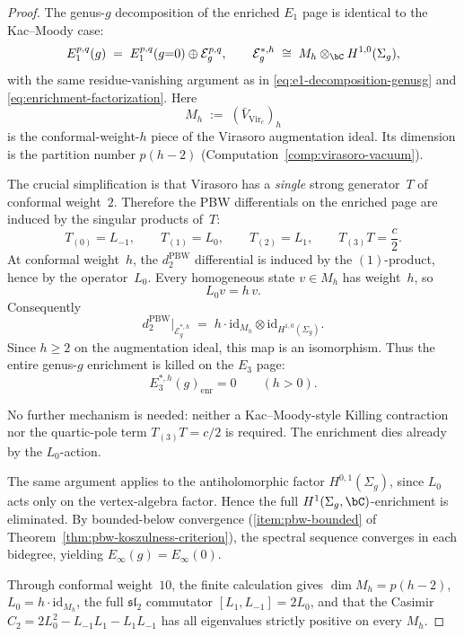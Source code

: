 \begin{proof}
The genus-$g$ decomposition of the enriched $E_1$ page is identical to
the Kac--Moody case:
\[
E_1^{p,q}(g) \;=\; E_1^{p,q}(g{=}0) \oplus \mathcal{E}^{p,q}_g,
\qquad
\mathcal{E}_g^{*,h} \;\cong\; M_h \otimes_{\bC} H^{1,0}(\Sigma_g),
\]
with the same residue-vanishing argument as in
\eqref{eq:e1-decomposition-genusg} and
\eqref{eq:enrichment-factorization}.  Here
\[
M_h \;:=\; (\bar{V}_{\mathrm{Vir}_c})_h
\]
is the conformal-weight-$h$ piece of the Virasoro augmentation ideal.
Its dimension is the partition number $p(h-2)$
\textup{(}Computation~\textup{\ref{comp:virasoro-vacuum}}\textup{)}.

The crucial simplification is that Virasoro has a \emph{single}
strong generator~$T$ of conformal weight~$2$.  Therefore the PBW
differentials on the enriched page are induced by the singular
products of~$T$:
\[
T_{(0)} = L_{-1}, \qquad
T_{(1)} = L_0, \qquad
T_{(2)} = L_1, \qquad
T_{(3)}T = \frac{c}{2}.
\]
At conformal weight~$h$, the $d_2^{\mathrm{PBW}}$ differential is
induced by the $(1)$-product, hence by the operator~$L_0$.
Every homogeneous state $v \in M_h$ has weight~$h$, so
\[
L_0 v = h\,v.
\]
Consequently
\[
d_2^{\mathrm{PBW}}\big|_{\mathcal{E}_g^{*,h}}
\;=\;
h \cdot \mathrm{id}_{M_h}
\otimes
\mathrm{id}_{H^{1,0}(\Sigma_g)}.
\]
Since $h \geq 2$ on the augmentation ideal, this map is an
isomorphism.  Thus the entire genus-$g$ enrichment is killed on the
$E_3$ page:
\[
E_3^{*,h}(g)_{\mathrm{enr}} = 0
\qquad (h > 0).
\]

No further mechanism is needed: neither a Kac--Moody-style Killing
contraction nor the quartic-pole term $T_{(3)}T = c/2$ is required.
The enrichment dies already by the $L_0$-action.

The same argument applies to the antiholomorphic factor
$H^{0,1}(\Sigma_g)$, since $L_0$ acts only on the vertex-algebra
factor.  Hence the full $H^1(\Sigma_g,\bC)$-enrichment is eliminated.
By bounded-below convergence
\textup{(}\ref{item:pbw-bounded} of
Theorem~\ref{thm:pbw-koszulness-criterion}\textup{)}, the spectral
sequence converges in each bidegree, yielding
$E_\infty(g) = E_\infty(0)$.

Through conformal weight~$10$, the finite calculation gives
$\dim M_h = p(h-2)$,
$L_0 = h \cdot \mathrm{id}_{M_h}$,
the full $\mathfrak{sl}_2$ commutator $[L_1, L_{-1}] = 2L_0$,
and that the Casimir $C_2 = 2L_0^2 - L_{-1}L_1 - L_1L_{-1}$
has all eigenvalues strictly positive on every $M_h$.
\end{proof}

